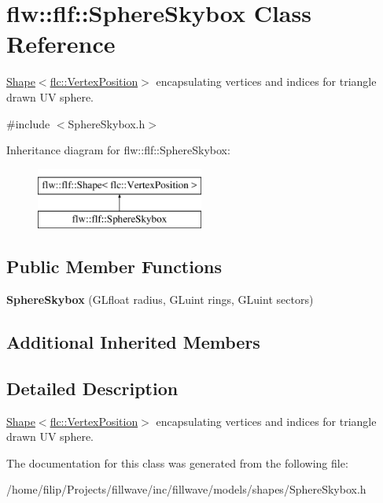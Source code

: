 \hypertarget{classflw_1_1flf_1_1SphereSkybox}{}\section{flw\+:\+:flf\+:\+:Sphere\+Skybox Class Reference}
\label{classflw_1_1flf_1_1SphereSkybox}


\hyperlink{classflw_1_1flf_1_1Shape}{Shape$<$flc\+::\+Vertex\+Position$>$} encapsulating vertices and indices for triangle drawn UV sphere.  




{\ttfamily \#include $<$Sphere\+Skybox.\+h$>$}

Inheritance diagram for flw\+:\+:flf\+:\+:Sphere\+Skybox\+:\begin{figure}[H]
\begin{center}
\leavevmode
\includegraphics[height=2.000000cm]{classflw_1_1flf_1_1SphereSkybox}
\end{center}
\end{figure}
\subsection*{Public Member Functions}
\begin{DoxyCompactItemize}
\item 
{\bfseries Sphere\+Skybox} (G\+Lfloat radius, G\+Luint rings, G\+Luint sectors)\hypertarget{classflw_1_1flf_1_1SphereSkybox_a978aaf6c0bf7d5898e8cf2a34bd6b356}{}\label{classflw_1_1flf_1_1SphereSkybox_a978aaf6c0bf7d5898e8cf2a34bd6b356}

\end{DoxyCompactItemize}
\subsection*{Additional Inherited Members}


\subsection{Detailed Description}
\hyperlink{classflw_1_1flf_1_1Shape}{Shape$<$flc\+::\+Vertex\+Position$>$} encapsulating vertices and indices for triangle drawn UV sphere. 

The documentation for this class was generated from the following file\+:\begin{DoxyCompactItemize}
\item 
/home/filip/\+Projects/fillwave/inc/fillwave/models/shapes/Sphere\+Skybox.\+h\end{DoxyCompactItemize}
